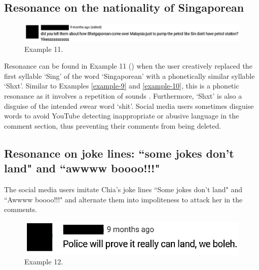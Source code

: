 \documentclass[english]{textolivre}
\begin{document}
\subsection{Resonance on the nationality of Singaporean}

\begin{figure}[h!]
    \centering
    \begin{minipage}{0.90\linewidth}
    \includegraphics[width=\linewidth]{imagens/exemplo11.png}
    \caption{Example 11.}\label{example-11}
    \end{minipage}
\end{figure}

Resonance can be found in Example 11 () when the user creatively replaced the first syllable ‘Sing’ of the word ‘Singaporean’ with a phonetically similar syllable ‘Shxt’. Similar to Examples \ref{example-9} and \ref{example-10}, this is a phonetic resonance as it involves a repetition of sounds \cite{tantucci2022a}. Furthermore, ‘Shxt’ is also a disguise of the intended swear word ‘shit’. Social media users sometimes disguise words to avoid YouTube detecting inappropriate or abusive language in the comment section, thus preventing their comments from being deleted.

\subsection{Resonance on joke lines: ``some jokes don’t land" and ``awwww boooo!!!"}
The social media users imitate Chia’s joke lines ``Some jokes don’t land" and ``Awwww boooo!!!" and alternate them into impoliteness to attack her in the comments.

\begin{figure}[h!]
    \centering
    \begin{minipage}{0.5\linewidth}
    \includegraphics[width=\linewidth]{imagens/exemplo12.png}
    \caption{Example 12.}\label{example-12}
    \end{minipage}
\end{figure}
\end{document}
